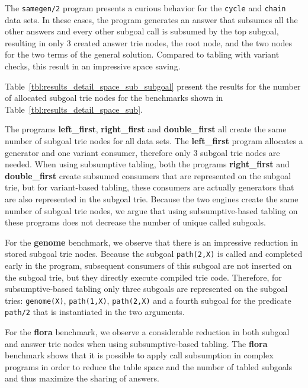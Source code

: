 

The \texttt{samegen/2} program presents a curious behavior for the \texttt{cycle} and \texttt{chain}
data sets. In these cases, the program generates an answer that subsumes all the other answers and
every other subgoal call is subsumed by the top subgoal, resulting in only 3 created answer trie nodes,
the root node, and the two nodes for the two terms of the general solution. Compared to tabling with
variant checks, this result in an impressive space saving.

Table~\ref{tbl:results_detail_space_sub_subgoal} present the results for the number of
allocated subgoal trie nodes for the benchmarks shown in Table~\ref{tbl:results_detail_space_sub}.



The programs \textbf{left\_first},
\textbf{right\_first} and \textbf{double\_first} all create the same number of subgoal trie nodes
for all data sets. The \textbf{left\_first} program allocates a generator and one variant consumer,
therefore only 3 subgoal trie nodes are needed.
When using subsumptive tabling, both the
programs \textbf{right\_first} and \textbf{double\_first} create subsumed consumers that are
represented on the subgoal trie, but for variant-based tabling, these consumers are actually
generators that are also represented in the subgoal trie. Because the two engines create the same
number of subgoal trie nodes, we argue that using subsumptive-based tabling on these programs
does not decrease the number of unique called subgoals.

For the \textbf{genome} benchmark, we observe that there is an impressive reduction in stored
subgoal trie nodes. Because the subgoal \texttt{path(2,X)} is called and completed early in the
program, subsequent consumers of this subgoal are not inserted on the subgoal trie, but they
directly execute compiled trie code. Therefore, for subsumptive-based tabling only three subgoals
are represented on the subgoal tries: \texttt{genome(X)}, \texttt{path(1,X)}, \texttt{path(2,X)}
and a fourth subgoal for the predicate \texttt{path/2} that is instantiated in the two arguments.

For the \textbf{flora} benchmark, we observe a considerable reduction in both subgoal and answer trie nodes
when using subsumptive-based tabling. The \textbf{flora} benchmark shows that it is possible to
apply call subsumption in complex programs in order to reduce the table space and the number of
tabled subgoals and thus maximize the sharing of answers.

